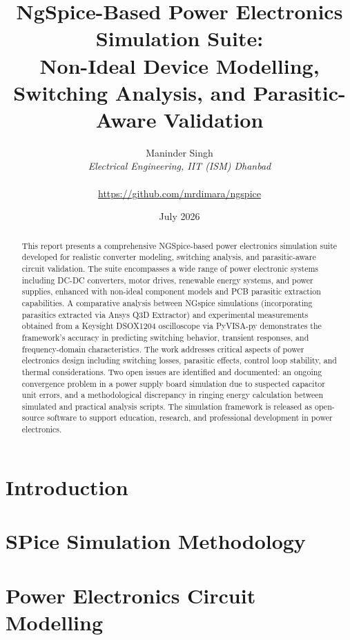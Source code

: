 \documentclass[11pt]{article}
\title{NgSpice-Based Power Electronics Simulation Suite:\\Non-Ideal Device Modelling, Switching Analysis, and Parasitic-Aware Validation}
\author{Maninder Singh\\\textit{Electrical Engineering, IIT (ISM) Dhanbad}\\\\\href{https://github.com/mrdimara/ngspice}{https://github.com/mrdimara/ngspice}}
\date{July 2026}
\begin{document}
\maketitle
\thispagestyle{empty}

\begin{abstract}
This report presents a comprehensive NGSpice-based power electronics simulation suite developed for realistic converter modeling, switching analysis, and parasitic-aware circuit validation. The suite encompasses a wide range of power electronic systems including DC-DC converters, motor drives, renewable energy systems, and power supplies, enhanced with non-ideal component models and PCB parasitic extraction capabilities. A comparative analysis between NGspice simulations (incorporating parasitics extracted via Ansys Q3D Extractor) and experimental measurements obtained from a Keysight DSOX1204 oscilloscope via PyVISA-py demonstrates the framework's accuracy in predicting switching behavior, transient responses, and frequency-domain characteristics. The work addresses critical aspects of power electronics design including switching losses, parasitic effects, control loop stability, and thermal considerations. Two open issues are identified and documented: an ongoing convergence problem in a power supply board simulation due to suspected capacitor unit errors, and a methodological discrepancy in ringing energy calculation between simulated and practical analysis scripts. The simulation framework is released as open-source software to support education, research, and professional development in power electronics.
\end{abstract}

\newpage
\tableofcontents
\newpage
\listoffigures
\newpage
\listoftables

\section{Introduction}
\label{sec:introduction}


\section{SPice Simulation Methodology}
\label{sec:spice_methodology}


\section{Power Electronics Circuit Modelling}
\label{sec:circuit_modelling}

\end{document}
